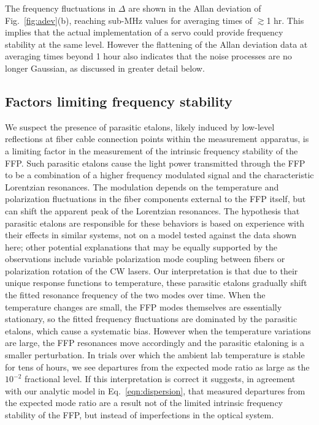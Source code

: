 \documentclass[10pt]{article}
\begin{document}
The frequency fluctuations in $\Delta$ are shown in the Allan deviation of Fig.~\ref{fig:adev}(b), reaching sub-MHz values for averaging times of $\gtrsim$1 hr. This implies that the actual implementation of a servo could provide frequency stability at the same level. However the flattening of the Allan deviation data at averaging times beyond 1 hour also indicates that the noise processes are no longer Gaussian, as discussed in greater detail below.

\subsection{Factors limiting frequency stability}
\label{sec:error_terms}

We suspect the presence of parasitic etalons, likely induced by low-level reflections at fiber cable connection points within the measurement apparatus, is a limiting factor in the measurement of the intrinsic frequency stability of the FFP. Such parasitic etalons cause the light power transmitted through the FFP to be a combination of a higher frequency modulated signal and the characteristic Lorentzian resonances.  The modulation depends on the temperature and polarization fluctuations in the fiber components external to the FFP itself, but can shift the apparent peak of the Lorentzian resonances. The hypothesis that parasitic etalons are responsible for these behaviors is based on experience with their effects in similar systems, not on a model tested against the data shown here; other potential explanations that may be equally supported by the observations include variable polarization mode coupling between fibers or polarization rotation of the CW lasers. Our interpretation is that due to their unique response functions to temperature, these parasitic etalons gradually shift the fitted resonance frequency of the two modes over time. When the temperature changes are small, the FFP modes themselves are essentially stationary, so the fitted frequency fluctuations are dominated by the parasitic etalons, which cause a systematic bias.  However when the temperature variations are large, the FFP resonances move accordingly and the parasitic etaloning is a smaller perturbation. In trials over which the ambient lab temperature is stable for tens of hours, we see departures from the expected mode ratio as large as the $10^{-2}$ fractional level. If this interpretation is correct it suggests, in agreement with our analytic model in Eq.~\eqref{eqn:dispersion}, that measured departures from the expected mode ratio are a result not of the limited intrinsic frequency stability of the FFP, but instead of imperfections in the optical system. 
\end{document}
